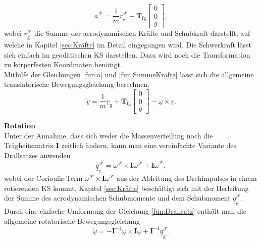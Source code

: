 \begin{equation}
\label{fun:SummeKräfte}
\underline{a}^\mathcal{F} = \dfrac{1}{m}\underline{r}^\mathcal{F}_\mathrm{g} + \textbf{T}_\mathrm{fg}\begin{bmatrix} 
0 \\ 0 \\ g 
\end{bmatrix},
\end{equation}
wobei $\underline{r}^\mathcal{F}_\mathrm{g}$ die Summe der aerodynamischen Kräfte und Schubkraft darstellt, auf welche in Kapitel \ref{sec:Kräfte} im Detail eingegangen wird. Die Schwerkraft lässt sich einfach im geodätischen KS darstellen. Dazu wird noch die Transformation zu körperfesten Koordinaten benötigt.\\
Mithilfe der Gleichungen \eqref{fun:a} und \eqref{fun:SummeKräfte} lässt sich die allgemeine translatorische Bewegungsgleichung berechnen.
\begin{equation}
\label{fund:TranslatGL}
\underline{\dot{v}} = \dfrac{1}{m}\underline{r}_\mathrm{g} + \textbf{T}_\mathrm{fg}\begin{bmatrix} 
0\\
0\\
g
\end{bmatrix} - \underline{\omega}\times\underline{v}.
\end{equation}

\textbf{Rotation}\\
Unter der Annahme, dass sich weder die Massenverteilung noch die Trägheitsmatrix $\textbf{I}$  zeitlich ändern, kann man eine vereinfachte Variante des Drallsatzes anwenden
\begin{equation}
\label{fun:Drallsatz}
\underline{q}^\mathcal{F}_\mathrm{g} =  \underline{\omega}^\mathcal{F}\times\textbf{I}\underline{\omega}^\mathcal{F} + \textbf{I}\underline{\dot{\omega}}^\mathcal{F},
\end{equation} 
wobei der Corioulis-Term $ \underline{\omega}^\mathcal{F}\times\textbf{I}\underline{\omega}^\mathcal{F}$ aus der Ableitung des Drehimpulses in einem rotierenden KS kommt. Kapitel \ref{sec:Kräfte} beschäftigt sich mit der Herleitung der Summe des aerodynamischen Schubmomente und dem Schubmoment $\underline{q}^\mathcal{F}_\mathrm{g}$. Durch eine einfache Umformung der Gleichung \eqref{fun:Drallsatz} enthält man die allgemeine rotatorische Bewegungsgleichung
\begin{equation}
\label{fund:RotGL}
\underline{\dot{\omega}} = -\textbf{I}^{-1}\underline{\omega}\times\textbf{I}\underline{\omega} + \textbf{I}^{-1}\underline{q}^\mathcal{F}_\mathrm{g}.
\end{equation} 

